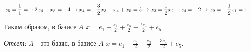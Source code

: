 \begin{enumerate}
    $\displaystyle x_5 = \frac{1}{1} = 1;\\
    2x_4 - x_5 = -4 \implies x_4 = -\frac{3}{2}\\
    x_3 - x_4 + x_5 = 3 \implies x_3 = \frac{1}{2}\\
    x_2 + x_4 = -2 \implies x_2 = -\frac{1}{2}\\
    x_1 = 1$

    Таким образом, в базисе $A$ $\displaystyle x = e_1 - \frac{e_2}{2} + \frac{e_3}{2} - \frac{3e_4}{2} + e_5$

    \textit{Ответ}: $A$ - это базис, в базисе $A$ $\displaystyle x = e_1 - \frac{e_2}{2} + \frac{e_3}{2} - \frac{3e_4}{2} + e_5$.
\end{enumerate}

\clearpage
